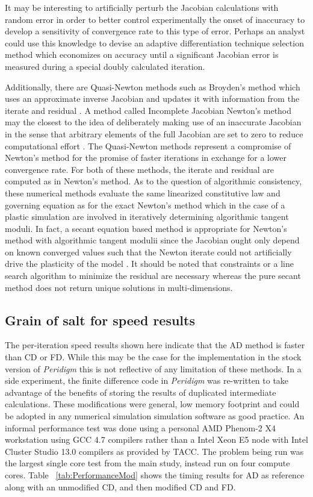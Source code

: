 \documentclass[preprint,12pt]{elsarticle}
\begin{document}
It may be interesting to artificially perturb the Jacobian calculations with
random error in order to better control experimentally the onset of inaccuracy
to develop a sensitivity of convergence rate to this type of error. Perhaps an
analyst could use this knowledge to devise an adaptive differentiation
technique selection method which economizes on accuracy until a significant
Jacobian error is measured during a special doubly calculated iteration.

Additionally, there are Quasi-Newton methods such as Broyden's method which
uses an approximate inverse Jacobian and updates it with information from the 
iterate and residual \cite{dennis1971convergence}. A method called
Incomplete Jacobian Newton's method may the closest to the idea of deliberately
making use of an inaccurate Jacobian in the sense that arbitrary elements of
the full Jacobian are set to zero to reduce computational effort
\cite{liu2008incomplete}. The Quasi-Newton methods represent a compromise of
Newton's method for the promise of faster iterations in exchange for a lower
convergence rate. For both of these methods, the iterate and residual are
computed as in Newton's method. As to the question of algorithmic consistency,
these numerical methods evaluate the same linearized constitutive law and
governing equation as for the exact Newton's method which in the case of a
plastic simulation are involved in iteratively determining algorithmic tangent moduli. 
In fact, a secant equation based method is appropriate for Newton's method with algorithmic
tangent modulii since the Jacobian ought only depend on known converged
values such that the Newton iterate could not artificially drive the plasticity
of the model \cite[Chap. 6]{belytschko1999nonlinear}. It should be noted that
constraints or a line search algorithm to minimize the residual are necessary
whereas the pure secant method does not return unique solutions in
multi-dimensions.
%

\subsection{Grain of salt for speed results}
The per-iteration speed results shown here indicate that the AD method is
faster than CD or FD.  While this may be the case for the implementation in the
stock version of \emph{Peridigm} this is not reflective of any limitation of
these methods. In a side experiment, the finite difference code in
\emph{Peridigm} was re-written to take advantage of the benefits of storing the
results of duplicated intermediate calculations. These modifications were 
general, low memory footprint and could be adopted in any numerical simulation
simulation software as good practice. An informal performance test was done
using a personal AMD Phenom-2 X4 workstation using GCC 4.7 compilers rather than a
Intel Xeon E5 node with Intel Cluster Studio 13.0 compilers as provided by TACC. The problem
being run was the largest single core test from the main study, instead run on four 
compute cores. Table ~\ref{tab:PerformanceMod} shows the timing
results for AD as reference along with an unmodified CD, and then modified CD
and FD.
\end{document}
